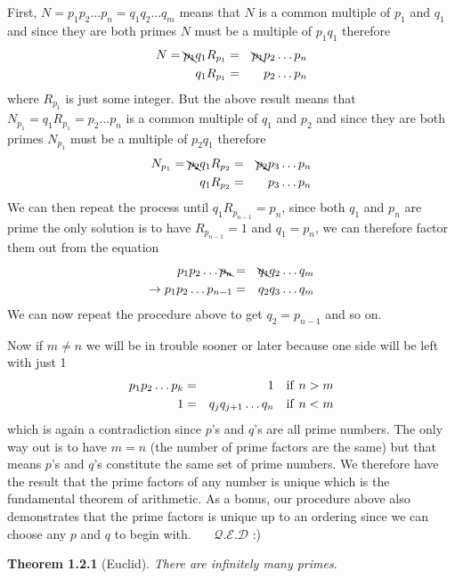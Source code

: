 \documentclass[aps,preprint,preprintnumbers,nofootinbib,showpacs,prd]{revtex4-1}
\newcommand{\nbea}{\begin{eqnarray*}}
\newcommand{\neea}{\end{eqnarray*}}
\begin{document}
First, $N=p_1 p_2 \dots p_n = q_1 q_2 \dots q_m$ means that $N$ is a common multiple of $p_1$ and $q_1$ and since they are both primes $N$ must be a multiple of $p_1q_1$ therefore
%
\nbea
N = \bcancel{p_1} q_1 R_{p_1} & = & \bcancel{p_1} p_2 \dots p_n \\
q_1 R_{p_1} & = & p_2 \dots p_n
\neea
%
where $R_{p_1}$ is just some integer. But the above result means that $N_{p_1} = q_1 R_{p_1} = p_2 \dots p_n$ is a common multiple of $q_1$ and $p_2$ and since they are both primes $N_{p_1}$ must be a multiple of $p_2q_1$ therefore
%
\nbea
N_{p_1} = \bcancel{p_2} q_1 R_{p_2} & = & \bcancel{p_2} p_3 \dots p_n \\
q_1 R_{p_2} & = & p_3 \dots p_n
\neea
%
We can then repeat the process until $q_1 R_{p_{n-1}} = p_n$, since both $q_1$ and $p_n$ are prime the only solution is to have $R_{p_{n-1}} = 1$ and $q_1 = p_n$, we can therefore factor them out from the equation
%
\nbea
p_1 p_2 \dots \bcancel{p_n} & = & \bcancel{q_1} q_2 \dots q_m \\
\to p_1 p_2 \dots p_{n-1} & = & q_2 q_3 \dots q_m
\neea
%
We can now repeat the procedure above to get $q_2 = p_{n-1}$ and so on.

Now if $m\neq n$ we will be in trouble sooner or later because one side will be left with just 1
%
\nbea
p_1 p_2 \dots p_k & = & 1 ~~~ {\rm if~} n > m \\
1 & = & q_j q_{j+1} \dots q_n ~~~ {\rm if~} n < m 
\neea
%
which is again a contradiction since $p$'s and $q$'s are all prime numbers. The only way out is to have $m=n$ (the number of prime factors are the same) but that means $p$'s and $q$'s constitute the same set of prime numbers. We therefore have the result that the prime factors of any number is unique which is the fundamental theorem of arithmetic. As a bonus, our procedure above also demonstrates that the prime factors is unique up to an ordering since we can choose any $p$ and $q$ to begin with.~~~ $\mathcal{Q.E.D}$ :)


{\bf Theorem 1.2.1} (Euclid). {\it There are infinitely many primes}.
\end{document}
